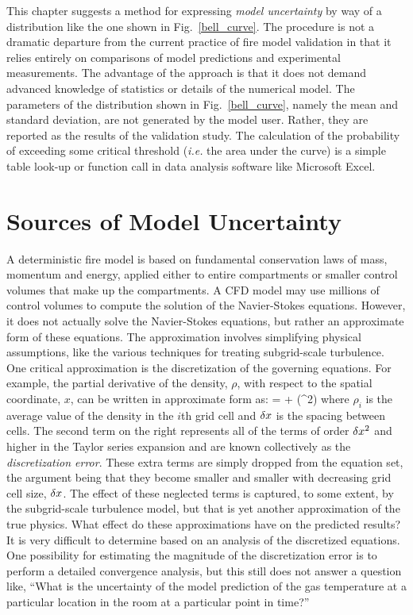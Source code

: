 This chapter suggests a method for expressing {\em model uncertainty} by way of a distribution like the one shown in Fig.~\ref{bell_curve}. The
procedure is not a dramatic departure from the current practice of fire model validation in that it relies entirely on comparisons of model
predictions and experimental measurements. The advantage of the approach is that it does not demand advanced knowledge of statistics or details of
the numerical model. The parameters of the distribution shown in Fig.~\ref{bell_curve}, namely the mean and standard deviation, are not generated by
the model user. Rather, they are reported as the results of the validation study. The calculation of the probability of exceeding some critical
threshold ({\em i.e.} the area under the curve) is a simple table look-up or function call in data analysis software like Microsoft
Excel\textregistered.



\section{Sources of Model Uncertainty}

A deterministic fire model is based on fundamental conservation laws of mass, momentum and energy,
applied either to entire compartments or smaller control
volumes that make up the compartments. A CFD model may use millions of control volumes to compute the
solution of the Navier-Stokes equations.
However, it does not actually solve the Navier-Stokes equations, but rather an approximate form of these equations.
The approximation involves simplifying
physical assumptions, like the various techniques for treating subgrid-scale turbulence.
One critical approximation is the discretization of the governing equations. For example,
the partial derivative of the density, $\rho$,
with respect to the spatial coordinate, $x$, can be written in approximate form as:
\be {} =  + (\dx^2) \ee
where $\rho_i$ is the average value of the density in the $i$th grid cell and $\delta x$ is the spacing between cells.
The second term on the right represents all of the terms of order $\delta x^2$ and higher in the Taylor
series expansion and are known collectively as the
{\em discretization error}. These extra terms are simply dropped from
the equation set, the argument being that they become smaller and smaller with decreasing grid cell size, $\delta x$.
The effect of these neglected terms is captured, to
some extent, by the subgrid-scale turbulence model, but that is yet another approximation of the true physics.
What effect do these approximations have on
the predicted results? It is very difficult to determine based on an analysis of the discretized equations.
One possibility for estimating
the magnitude of the discretization error is to perform a detailed
convergence analysis, but this still does not answer a
question like, ``What is the uncertainty of the model prediction of the gas
temperature at a particular location in the room at a particular point in time?''

